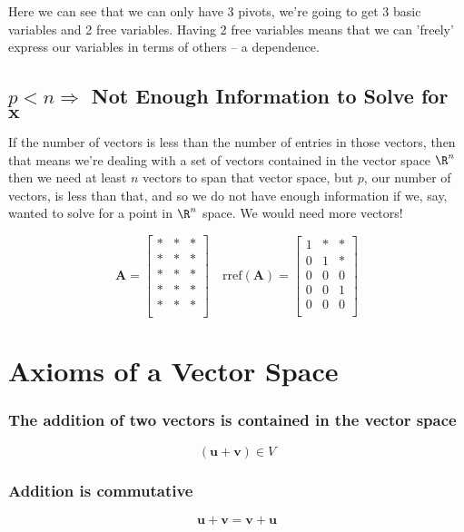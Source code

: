 \documentclass{article}
\begin{document}
Here we can see that we can only have 3 pivots, we're going to get 3 basic
variables and 2 free variables. Having 2 free variables means that we can
'freely' express our variables in terms of others --  a dependence.

\subsection{$ p<n \Rightarrow $ Not Enough Information to Solve for $ \mathbf{x} $} 

If the number of vectors is less than the number of entries in those vectors,
then that means we're dealing with a set of vectors contained in the vector
space $ \R^{n}$ then we need at least $ n $ vectors to span that vector space,
but $ p $, our number of vectors, is less than that, and so we do not have
enough information if we, say, wanted to solve for a point in $ \R^{n}$ space.
We would need more vectors!

\[%
    \mathbf{A} = 
    \begin{bmatrix}
        * & * & * \\
		* & * & * \\
		* & * & * \\		
        * & * & * \\
		* & * & * \\
    \end{bmatrix}
    \quad
    \text{rref} \left(\mathbf{A}\right) = 
    \begin{bmatrix}
        1 & * & * \\
		0 & 1 & * \\
		0 & 0 & 0 \\		
        0 & 0 & 1 \\
		0 & 0 & 0 \\
    \end{bmatrix}
\]%

\section{Axioms of a Vector Space} 

\subsubsection{The addition of two vectors is contained in the vector space} 
\[%
    \left(\mathbf{u}+\mathbf{v}\right) \in V
\]%
\subsubsection{Addition is commutative}
\[%
    \mathbf{u}+ \mathbf{v}=\mathbf{v}+ \mathbf{u}
\]%
\end{document}
